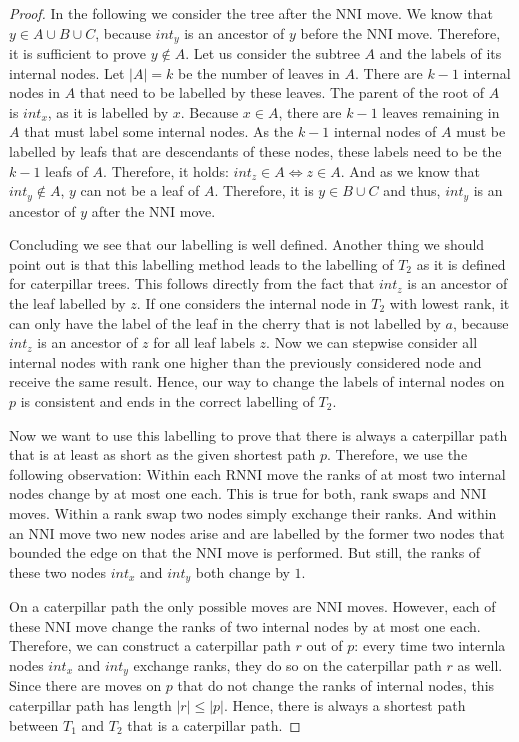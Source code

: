\documentclass[11pt, a4paper]{article}
\newcommand{\nni}{\mathrm{NNI}}
\newcommand{\rnni}{\mathrm{RNNI}}
\begin{document}
\begin{proof}
	In the following we consider the tree after the $\nni$ move.
	We know that $y \in A \cup B \cup C$, because $int_y$ is an ancestor of $y$ before the $\nni$ move.
	Therefore, it is sufficient to prove $y \notin A$.
	Let us consider the subtree $A$ and the labels of its internal nodes.
	Let $|A| = k$ be the number of leaves in $A$.
	There are $k-1$ internal nodes in $A$ that need to be labelled by these leaves.
	The parent of the root of $A$ is $int_x$, as it is labelled by $x$.
	Because $x \in A$, there are $k - 1$ leaves remaining in $A$ that must label some internal nodes.
	As the $k-1$ internal nodes of $A$ must be labelled by leafs that are descendants of these nodes, these labels need to be the $k-1$ leafs of $A$.
	Therefore, it holds:
	$int_z \in A \iff z \in A$.
	And as we know that $int_y \notin A$, $y$ can not be a leaf of $A$.
	Therefore, it is $y \in B \cup C$ and thus, $int_y$ is an ancestor of $y$ after the $\nni$ move.

	Concluding we see that our labelling is well defined.
	Another thing we should point out is that this labelling method leads to the labelling of $T_2$ as it is defined for caterpillar trees.
	This follows directly from the fact that $int_z$ is an ancestor of the leaf labelled by $z$.
	If one considers the internal node in $T_2$ with lowest rank, it can only have the label of the leaf in the cherry that is not labelled by $a$, because $int_z$ is an ancestor of $z$ for all leaf labels $z$.
	Now we can stepwise consider all internal nodes with rank one higher than the previously considered node and receive the same result.
	Hence, our way to change the labels of internal nodes on $p$ is consistent and ends in the correct labelling of $T_2$.

	Now we want to use this labelling to prove that there is always a caterpillar path that is at least as short as the given shortest path $p$.
	Therefore, we use the following observation:
	Within each $\rnni$ move the ranks of at most two internal nodes change by at most one each.
	This is true for both, rank swaps and $\nni$ moves.
	Within a rank swap two nodes simply exchange their ranks.
	And within an $\nni$ move two new nodes arise and are labelled by the former two nodes that bounded the edge on that the $\nni$ move is performed.
	But still, the ranks of these two nodes $int_x$ and $int_y$ both change by $1$.

	On a caterpillar path the only possible moves are $\nni$ moves.
	However, each of these $\nni$ move change the ranks of two internal nodes by at most one each.
	Therefore, we can construct a caterpillar path $r$ out of $p$:
	every time two internla nodes $int_x$ and $int_y$ exchange ranks, they do so on the caterpillar path $r$ as well.
	Since there are moves on $p$ that do not change the ranks of internal nodes, this caterpillar path has length $|r| \leq |p|$.
	Hence, there is always a shortest path between $T_1$ and $T_2$ that is a caterpillar path.
\end{proof}
\end{document}
